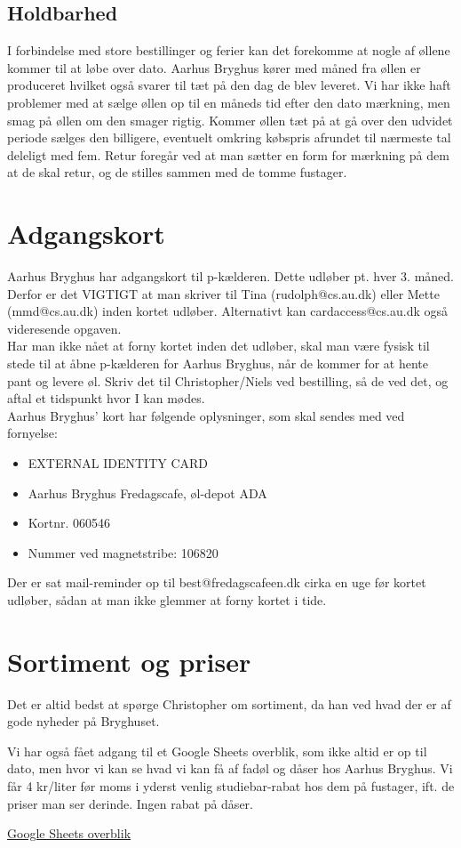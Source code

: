 \subsection{Holdbarhed}

I forbindelse med store bestillinger og ferier kan det forekomme at nogle af øllene kommer til at løbe over dato.
Aarhus Bryghus kører med måned fra øllen er produceret hvilket også svarer til tæt på den dag de blev leveret.
Vi har ikke haft problemer med at sælge øllen op til en måneds tid efter den dato mærkning, men smag på øllen
om den smager rigtig. Kommer øllen tæt på at gå over den udvidet periode sælges den billigere,
eventuelt omkring købspris afrundet til nærmeste tal deleligt med fem.
Retur foregår ved at man sætter en form for mærkning på dem at de skal retur, og de stilles sammen
med de tomme fustager.



\section{Adgangskort}
Aarhus Bryghus har adgangskort til p-kælderen. Dette udløber pt. hver 3. måned. Derfor er det VIGTIGT at man skriver til Tina (rudolph@cs.au.dk) eller Mette (mmd@cs.au.dk) inden kortet udløber. Alternativt kan cardaccess@cs.au.dk også videresende opgaven. \\
Har man ikke nået at forny kortet inden det udløber, skal man være fysisk til stede til at åbne p-kælderen for Aarhus Bryghus, når de kommer for at hente pant og levere øl. Skriv det til Christopher/Niels ved bestilling, så de ved det, og aftal et tidspunkt hvor I kan mødes. \\
Aarhus Bryghus' kort har følgende oplysninger, som skal sendes med ved fornyelse:
\begin{itemize}
    \item EXTERNAL IDENTITY CARD
    \item Aarhus Bryghus Fredagscafe, øl-depot ADA
    \item Kortnr. 060546
    \item Nummer ved magnetstribe: 106820
\end{itemize}
Der er sat mail-reminder op til best@fredagscafeen.dk cirka en uge før kortet udløber, sådan at man ikke glemmer at forny kortet i tide.


\section{Sortiment og priser}
Det er altid bedst at spørge Christopher om sortiment, da han ved hvad der er af gode nyheder på Bryghuset.

Vi har også fået adgang til et Google Sheets overblik, som ikke altid er op til dato, men hvor vi kan se hvad vi kan få af fadøl og dåser hos Aarhus Bryghus. Vi får 4 kr/liter før moms i yderst venlig studiebar-rabat hos dem på fustager, ift. de priser man ser derinde. Ingen rabat på dåser.

\href{https://docs.google.com/spreadsheets/d/1woU3ttgaFa108hYzXOAtH7SKW-YQArFpZrfmMY5OPss/edit?usp=sharing}{Google Sheets overblik}


